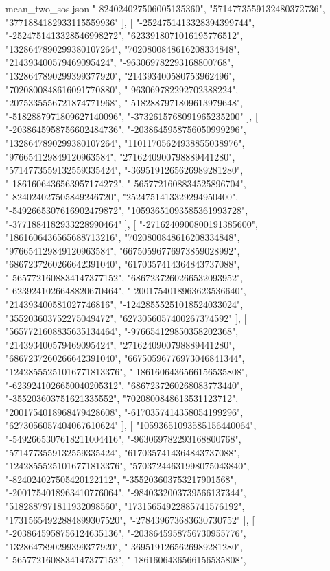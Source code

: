 \begin{filecontents*}[overwrite]{mean_two_sos.json}
    "-824024027506005135360",
    "5714773559132480372736",
    "3771884182933115559936"
   ],
   [
    "-2524751413328394399744",
    "-2524751413328546998272",
    "6233918071016195776512",
    "1328647890299380107264",
    "7020800848616208334848",
    "214393400579469095424",
    "-963069782293168800768",
    "1328647890299399377920",
    "214393400580753962496",
    "7020800848616091770880",
    "-963069782292702388224",
    "2075335556721874771968",
    "-5182887971809613979648",
    "-5182887971809627140096",
    "-3732615768091965235200"
   ],
   [
    "-2038645958756602484736",
    "-2038645958756050999296",
    "1328647890299380107264",
    "11011705624938855038976",
    "976654129849120963584",
    "2716240900798889441280",
    "5714773559132559335424",
    "-3695191265626989281280",
    "-1861606436563957174272",
    "-5657721608834525896704",
    "-824024027505849246720",
    "2524751413329294950400",
    "-5492665307616902479872",
    "10593651093585361993728",
    "-3771884182933228990464"
   ],
   [
    "-2716240900800191385600",
    "1861606436565688713216",
    "7020800848616208334848",
    "976654129849120963584",
    "66750596776973859028992",
    "6867237260266642391040",
    "6170357414364843737088",
    "-5657721608834147377152",
    "6867237260266532093952",
    "-6239241026648820670464",
    "-2001754018963623536640",
    "214393400581027746816",
    "-12428555251018524033024",
    "355203603752275049472",
    "6273056057400267374592"
   ],
   [
    "5657721608835635134464",
    "-976654129850358202368",
    "214393400579469095424",
    "2716240900798889441280",
    "6867237260266642391040",
    "66750596776973046841344",
    "12428555251016771813376",
    "-1861606436566156535808",
    "-6239241026650040205312",
    "6867237260268083773440",
    "-355203603751621335552",
    "7020800848613531123712",
    "2001754018968479428608",
    "-6170357414358054199296",
    "6273056057404067610624"
   ],
   [
    "10593651093585156440064",
    "-5492665307618211004416",
    "-963069782293168800768",
    "5714773559132559335424",
    "6170357414364843737088",
    "12428555251016771813376",
    "57037244631998075043840",
    "-824024027505420122112",
    "-355203603753217901568",
    "-2001754018963410776064",
    "-9840332003739566137344",
    "5182887971811932098560",
    "17315654922885741576192",
    "17315654922884899307520",
    "-278439673683630730752"
   ],
   [
    "-2038645958756124635136",
    "-2038645958756730955776",
    "1328647890299399377920",
    "-3695191265626989281280",
    "-5657721608834147377152",
    "-1861606436566156535808",

\end{filecontents*}
